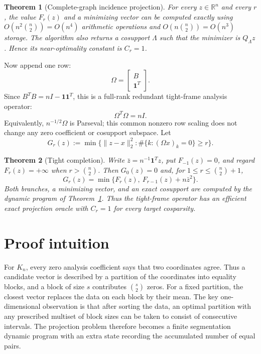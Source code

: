 \documentclass[11pt]{article}
\newtheorem{theorem}{Theorem}
\newcommand{\R}{\mathbb{R}}
\newcommand{\one}{\mathbf{1}}
\begin{document}
\begin{theorem}[Complete-graph incidence projection]\label{thm:incidence}
For every $z\in\R^n$ and every $r$, the value $F_r(z)$ and a minimizing
vector can be computed exactly using $O(n^2\binom n2)=O(n^4)$ arithmetic
operations and $O(n\binom n2)=O(n^3)$ storage. The algorithm also returns a
cosupport $\Lambda$ such that the minimizer is $Q_\Lambda z$. Hence its
near-optimality constant is $C_r=1$.
\end{theorem}

Now append one row:
\[
 \Omega=\begin{bmatrix}B\\ \one^T\end{bmatrix}.
\]
Since $B^TB=nI-\one\one^T$, this is a full-rank redundant tight-frame
analysis operator:
\[
 \Omega^T\Omega=nI.
\]
Equivalently, $n^{-1/2}\Omega$ is Parseval; this common nonzero row scaling
does not change any zero coefficient or cosupport subspace.
Let
\[
 G_r(z):=\min\{\|z-x\|_2^2:\#\{k:(\Omega x)_k=0\}\ge r\}.
\]

\begin{theorem}[Tight completion]\label{thm:tight}
Write $\bar z=n^{-1}\one^Tz$, put $F_{-1}(z)=0$, and regard
$F_r(z)=+\infty$ when $r>\binom n2$. Then $G_0(z)=0$ and, for
$1\le r\le\binom n2+1$,
\[
 \boxed{\quad G_r(z)=\min\big\{F_r(z),\ F_{r-1}(z)+n\bar z^2\big\}.\quad}
\]
Both branches, a minimizing vector, and an exact cosupport are computed by
the dynamic program of Theorem~\ref{thm:incidence}. Thus the tight-frame
operator has an efficient exact projection oracle with $C_r=1$ for every
target cosparsity.
\end{theorem}

\section{Proof intuition}

For $K_n$, every zero analysis coefficient says that two coordinates agree.
Thus a candidate vector is described by a partition of the coordinates into
equality blocks, and a block of size $s$ contributes $\binom{s}{2}$ zeros.
For a fixed partition, the closest vector replaces the data on each block by
their mean. The key one-dimensional observation is that after sorting the
data, an optimal partition with any prescribed multiset of block sizes can be
taken to consist of consecutive intervals. The projection problem therefore
becomes a finite segmentation dynamic program with an extra state recording
the accumulated number of equal pairs.
\end{document}
